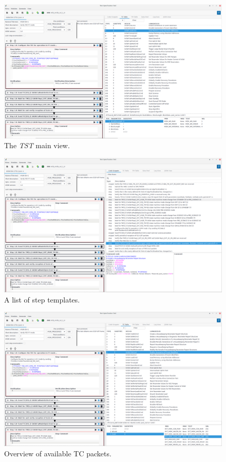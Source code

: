 \begin{figure}\label{fig:tstmain}
\includegraphics[width=1.\textwidth]{../shared/images/tst.png} 
\caption{The \emph{TST} main view.}
\end{figure}

\begin{figure}\label{fig:tstsnips}
\includegraphics[width=1.\textwidth]{../shared/images/tst_snips.png} 
\caption{A list of step templates.}
\end{figure}

\begin{figure}\label{fig:tctab}
\includegraphics[width=1.\textwidth]{../shared/images/tctab.png} 
\caption{Overview of available TC packets.}
\end{figure}


